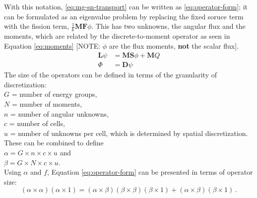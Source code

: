 \documentclass[12pt]{article}
\newcommand{\ve}[1]{\ensuremath{\mathbf{#1}}}
\begin{document}
With this notation, \autoref{eq:mg-sn-transport} can be written as \autoref{eq:operator-form}; it can be formulated as an eigenvalue problem by replacing the fixed soruce term with the fission term, $\frac{1}{k}\mathbf{MF}\phi$. This has two unknowns, the angular flux and the moments, which are related by the discrete-to-moment operator as seen in Equation \eqref{eq:moments} [NOTE: $\phi$ are the flux moments, \textbf{not} the scalar flux].
%
\begin{align}
  \mathbf{L} \psi &= \mathbf{MS}\phi + \ve{M}Q \label{eq:operator-form}\\
  \Phi &= \mathbf{D}\psi 
  \label{eq:moments}
\end{align}
%
The size of the operators can be defined in terms of the granularity of discretization: \\
%
\hspace*{2em} $G$ = number of energy groups, \\
\hspace*{2em} $N$ = number of moments, \\
\hspace*{2em} $n$ = number of angular unknowns, \\
\hspace*{2em} $c$ = number of cells, \\
\hspace*{2em} $u$ = number of unknowns per cell, which is determined by spatial discretization. \\
%
These can be combined to define \\
\hspace*{2em} $\alpha = G \times n \times c \times u$ and \\
\hspace*{2em} $\beta = G \times N \times c \times u$. \\
Using $\alpha$ and $f$, Equation \eqref{eq:operator-form} can be presented in terms of operator size:\\
\[
(\alpha \times \alpha)(\alpha \times 1) = (\alpha \times \beta) (\beta \times \beta) (\beta \times 1) + (\alpha \times \beta) (\beta \times 1)\:.
\]
\end{document}
